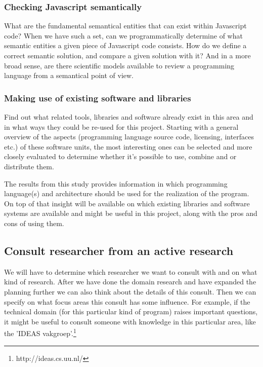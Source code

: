 \documentclass{article}
\begin{document}
\subsubsection{Checking Javascript semantically}
What are the fundamental semantical entities that can exist within Javascript code? When we have such a set, can we programmatically determine of what semantic entities a given piece of Javascript code consists. How do we define a correct semantic solution, and compare a given solution with it? And in a more broad sense, are there scientific models available to review a programming language from a semantical point of view.
\subsubsection{Making use of existing software and libraries}
Find out what related tools, libraries and software already exist in this area and in what ways they could be re-used for this project. Starting with a general overview of the aspects (programming language source code, licensing, interfaces etc.) of these software units, the most interesting ones can be selected and more closely evaluated to determine whether it's possible to use, combine and or distribute them.

The results from this study provides information in which programming language(s) and architecture should be used for the realization of the program. On top of that insight will be available on which existing libraries and software systems are available and might be useful in this project, along with the pros and cons of using them.

\subsection{Consult researcher from an active research}
We will have to determine which researcher we want to consult with and on what kind of research. After we have done the domain research and have expanded the planning further we can also think about the details of this consult. Then we can specify on what focus areas this consult has some influence. For example, if the technical domain (for this particular kind of program) raises important questions, it might be useful to consult someone with knowledge in this particular area, like the 'IDEAS vakgroep'.\footnote{http://ideas.cs.uu.nl/}\\
\end{document}
